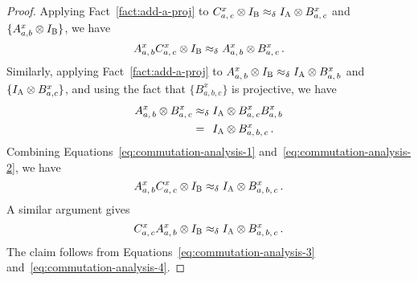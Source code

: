 \documentclass[11pt]{article}
\newtheorem{lemma}[theorem]{Lemma}
\theoremstyle{definition}
\newcommand{\Id}{\ensuremath{I}}
\newcommand{\labelstyle}[1]{\ensuremath{\textsc{#1}}\xspace}
\newcommand{\alice}{\labelstyle{A}}
\newcommand{\bob}{\labelstyle{B}}
\renewcommand{\cal}[1]{\mathcal{#1}}
\newcommand{\hnote}[1]{}
\begin{document}
\begin{proof}
  Applying Fact~\ref{fact:add-a-proj} to $C^x_{a,\, c} \otimes \Id_\bob \approx_\delta \Id_\alice \otimes B^x_{a,\, c}$ and $\{A^x_{a,b} \otimes \Id_\bob \}$, we have
  \begin{equation}
    \label{eq:commutation-analysis-1}
    A^x_{a,\, b} C^x_{a,\, c} \otimes \Id_\bob
    \approx_\delta A^x_{a,\, b} \otimes B^x_{a,\, c}\,.
  \end{equation}
  Similarly, applying Fact~\ref{fact:add-a-proj} to $A^x_{a,\, b} \otimes \Id_\bob \approx_\delta \Id_\alice \otimes B^x_{a,\,
    b}$ and $\{\Id_\alice \otimes B^x_{a,c}\}$, and using the fact that $\{B^x_{a,b,c}\}$ is projective, we have
  \begin{equation}
    \label{eq:commutation-analysis-2}
    \begin{split}
      A^x_{a,\, b} \otimes B^x_{a,\, c}
      & \approx_\delta \Id_\alice \otimes B^x_{a,\, c} B^x_{a,\, b}\\
      & =_{\phantom{\delta}} \Id_\alice \otimes B^x_{a,\, b,\, c}\,.
    \end{split}
  \end{equation}
  Combining Equations~\eqref{eq:commutation-analysis-1}
  and~\eqref{eq:commutation-analysis-2}, we have
  \begin{equation}
    \label{eq:commutation-analysis-3}
    A^x_{a,\, b} C^x_{a,\, c} \otimes \Id_\bob \approx_\delta
    \Id_\alice \otimes B^x_{a,\, b,\, c}\,.
  \end{equation}
  A similar argument gives
  \begin{equation}
    \label{eq:commutation-analysis-4}
    C^x_{a,\, c} A^x_{a,\, b} \otimes \Id_\bob \approx_\delta
    \Id_\alice \otimes B^x_{a,\, b,\, c}\,.
  \end{equation}
  The claim follows from Equations~\eqref{eq:commutation-analysis-3}
  and~\eqref{eq:commutation-analysis-4}.
\end{proof}
%
\end{document}
